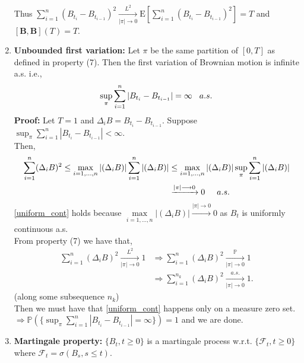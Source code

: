 \documentclass[12pt]{report}
\newcommand{\E}{\mathrm{E}}
\begin{document}
\begin{enumerate}
    Thus $ \sum_{i=1}^{n} (B_{t_i} - B_{t_{i-1}})^{2} \xrightarrow[|\pi|\longrightarrow 0]{L^{2}} \E[ \sum_{i=1}^{n} (B_{t_i} - B_{t_{i-1}})^{2}]=T$
    and $[\mathbf{B},\mathbf{B}](T) = T$.\\
    \item \textbf{Unbounded first variation:} Let $\pi$ be the same partition of $[0,T]$ as defined in property (7). Then the first variation of Brownian motion is infinite a.s. i.e.,\\
    $$\sup_{\pi} \sum_{i=1}^{n} |B_{t_i} - B_{t_{i-1}}| = \infty \hspace{0.3cm}a.s.$$
    \textbf{Proof:} Let $T=1$ and $\Delta_i B=B_{t_i} - B_{t_{i-1}}$. Suppose $\sup_{\pi} \sum_{i=1}^{n} |B_{t_i} - B_{t_{i-1}}| < \infty$.\\Then,
    \begin{equation}
        \begin{aligned}
           \sum_{i=1}^{n} (\Delta_i B)^2 \leq \max\limits_{i=1,...,n}|(\Delta_i B)| \sum_{i=1}^{n} |(\Delta_i B)| & \leq \max\limits_{i=1,...,n} |(\Delta_i B)| \sup_{\pi}\sum_{i=1}^{n} |(\Delta_i B)|\\
           & \xrightarrow{|\pi|\longrightarrow 0 } 0 \hspace{0.5cm}a.s.
        \end{aligned}
        \label{uniform_cont}
    \end{equation}
    \ref{uniform_cont} holds because $\max\limits_{i=1,...,n}|(\Delta_i B)|\xrightarrow{|\pi|\longrightarrow 0 } 0 $ as $B_t$ is uniformly continuous a.s.\\ From property (7) we have that,\\
    \begin{align*}
       \sum_{i=1}^{n} (\Delta_i B)^2 \xrightarrow[|\pi|\longrightarrow 0]{L^{2}} 1 &\Longrightarrow \sum_{i=1}^{n} (\Delta_i B)^2 \xrightarrow[|\pi|\longrightarrow 0]{\mathbb{P}} 1\\
       & \Longrightarrow \sum_{i=1}^{n_k} (\Delta_i B)^2 \xrightarrow[|\pi|\longrightarrow 0]{a.s.} 1.
    \end{align*}
    \hspace{7cm}(along some subsequence $n_k$)\\
    Then we must have that \ref{uniform_cont} happens only on a measure zero set.\\
    $\Longrightarrow \mathbb{P}(\{\sup_{\pi} \sum_{i=1}^{n} |B_{t_i} - B_{t_{i-1}}| = \infty\}) = 1$ and we are done.
    \item \textbf{Martingale property:} $\{B_t,t \geq 0 \}$ is a martingale process w.r.t. $\{\mathcal{F}_t,t \geq 0 \}$ where $\mathcal{F}_t = \sigma(B_s,s \leq t)$.\\

\end{enumerate}
\end{document}
